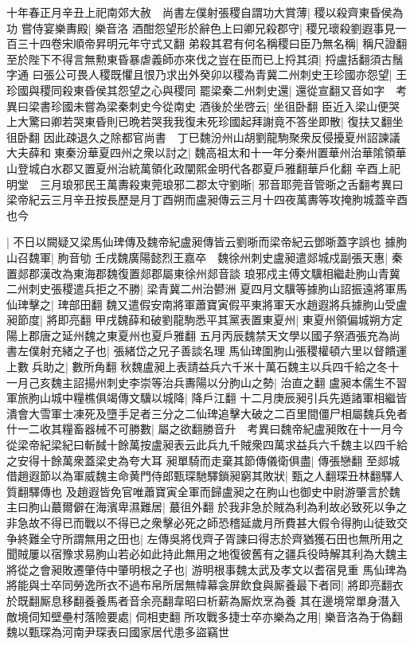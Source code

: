 十年春正月辛丑上祀南郊大赦　尚書左僕射張稷自謂功大賞薄|{
	稷以殺齊東昏侯為功}
嘗侍宴樂夀殿|{
	樂音洛}
酒酣怨望形於辭色上曰卿兄殺郡守|{
	稷兄瓌殺劉遐事見一百三十四卷宋順帝昇明元年守式又翻}
弟殺其君有何名稱稷曰臣乃無名稱|{
	稱尺證翻}
至於陛下不得言無勲東昏暴虐義師亦來伐之豈在臣而已上捋其須|{
	捋盧括翻須古鬚字通}
曰張公可畏人稷既懼且恨乃求出外癸卯以稷為青冀二州刺史王珍國亦怨望|{
	王珍國與稷同殺東昏侯其怨望之心與稷同}
罷梁秦二州刺史還|{
	還從宣翻又音如字　考異曰梁書珍國未嘗為梁秦刺史今從南史}
酒後於坐啓云|{
	坐徂卧翻}
臣近入梁山便哭上大驚曰卿若哭東昏則已晩若哭我我復未死珍國起拜謝竟不答坐即散|{
	復扶又翻坐徂卧翻}
因此疎退久之除都官尚書　丁巳魏汾州山胡劉龍駒聚衆反侵擾夏州詔諫議大夫薛和東秦汾華夏四州之衆以討之|{
	魏高祖太和十一年分秦州置華州治華隂領華山登城白水郡又置夏州治統萬領化政闡熙金明代各郡夏戶雅翻華戶化翻}
辛酉上祀明堂　三月琅邪民王萬夀殺東莞琅邪二郡太守劉晣|{
	邪音耶莞音管晣之舌翻考異曰梁帝紀云三月辛丑按長歷是月丁酉朔而盧昶傳云三月十四夜萬夀等攻掩朐城蓋辛酉也今}


|{
	不日以闕疑又梁馬仙琕傳及魏帝紀盧昶傳皆云劉晣而梁帝紀云鄧晣蓋字誤也}
據朐山召魏軍|{
	朐音劬}
壬戌魏廣陽懿烈王嘉卒　魏徐州刺史盧昶遣郯城戍副張天惠|{
	秦置郯郡漢改為東海郡魏復置郯郡屬東徐州郯音談}
琅邪戍主傅文驥相繼赴朐山青冀二州刺史張稷遣兵拒之不勝|{
	梁青冀二州治鬰洲}
夏四月文驥等據朐山詔振遠將軍馬仙琕擊之|{
	琕部田翻}
魏又遣假安南將軍蕭寶寅假平東將軍天水趙遐將兵據朐山受盧昶節度|{
	將即亮翻}
甲戌魏薛和破劉龍駒悉平其黨表置東夏州|{
	東夏州領偏城朔方定陽上郡唐之延州魏之東夏州也夏戶雅翻}
五月丙辰魏禁天文學以國子祭酒張充為尚書左僕射充緒之子也|{
	張緒岱之兄子善談名理}
馬仙琕圍朐山張稷權頓六里以督饋運上數兵助之|{
	數所角翻}
秋魏盧昶上表請益兵六千米十萬石魏主以兵四千給之冬十一月己亥魏主詔揚州刺史李崇等治兵夀陽以分朐山之勢|{
	治直之翻}
盧昶本儒生不習軍旅朐山城中糧樵俱竭傳文驥以城降|{
	降戶江翻}
十二月庚辰昶引兵先遁諸軍相繼皆潰會大雪軍士凍死及墮手足者三分之二仙琕追擊大破之二百里間僵尸相屬魏兵免者什一二收其糧畜器械不可勝數|{
	屬之欲翻勝音升　考異曰魏帝紀盧昶敗在十一月今從梁帝紀梁紀曰斬馘十餘萬按盧昶表云此兵九千賊衆四萬求益兵六千魏主以四千給之安得十餘萬衆蓋梁史為夸大耳}
昶單騎而走棄其節傳儀衛俱盡|{
	傳張戀翻}
至郯城借趙遐節以為軍威魏主命黄門侍郎甄琛馳驛鎖昶窮其敗狀|{
	甄之人翻琛丑林翻驛人質翻驛傳也}
及趙遐皆免官唯蕭寶寅全軍而歸盧昶之在朐山也御史中尉游肇言於魏主曰朐山蕞爾僻在海濱卑濕難居|{
	蕞徂外翻}
於我非急於賊為利為利故必致死以争之非急故不得已而戰以不得已之衆擊必死之師恐稽延歲月所費甚大假令得朐山徒致交争終難全守所謂無用之田也|{
	左傳吳將伐齊子胥諫曰得志於齊猶獲石田也無所用之}
聞賊屢以宿豫求易朐山若必如此持此無用之地復彼舊有之疆兵役時解其利為大魏主將從之會昶敗遷肇侍中肇明根之子也|{
	游明根事魏太武及孝文以耆宿見重}
馬仙琕為將能與士卒同勞逸所衣不過布帛所居無幃幕衾屏飲食與厮養最下者同|{
	將即亮翻衣於既翻厮息移翻養養馬者音余亮翻韋昭曰析薪為厮炊烹為養}
其在邊境常單身潛入敵境伺知壁壘村落險要處|{
	伺相吏翻}
所攻戰多捷士卒亦樂為之用|{
	樂音洛為于偽翻}
魏以甄琛為河南尹琛表曰國家居代患多盜竊世

